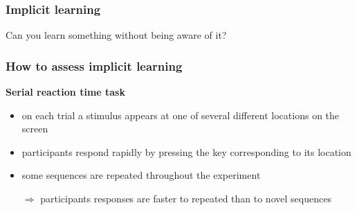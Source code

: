 \documentclass[]{beamer}
\begin{document}
\begin{frame}
 \frametitle{Implicit learning}
\begin{overlayarea}{110mm}{80mm}
 Can you learn something without being aware of it? \vspace{2mm}


\end{overlayarea}
\end{frame}



\begin{frame}
 \frametitle{How to assess implicit learning}
\begin{overlayarea}{110mm}{60mm}
\textbf{Serial reaction time task}
\begin{itemize}
 \item on each trial a stimulus appears at one of several different locations on the screen
 \item participants respond rapidly by pressing the key corresponding to its location
 \item some sequences are repeated throughout the experiment
 \item[$\Rightarrow$] participants responses are faster to repeated than to novel sequences
\end{itemize}
\end{overlayarea}
\end{frame}
\end{document}
